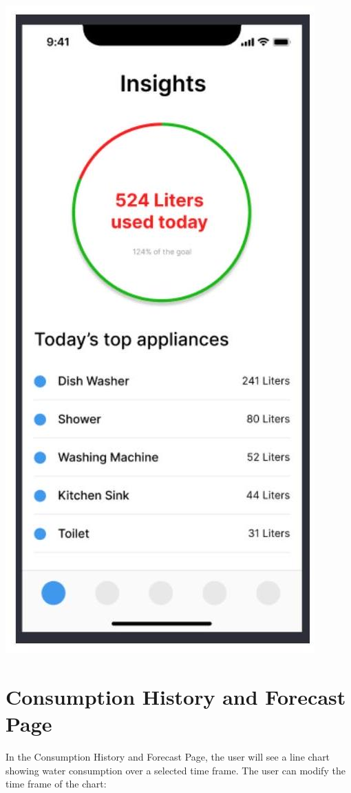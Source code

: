 \documentclass[10pt]{article}
\begin{document}
\includegraphics[max width=\textwidth]{2022_11_16_e80008f3d60227bff292g-6(1)}

\section{Consumption History and Forecast Page}
In the Consumption History and Forecast Page, the user will see a line chart showing water consumption over a selected time frame. The user can modify the time frame of the chart:
\end{document}
